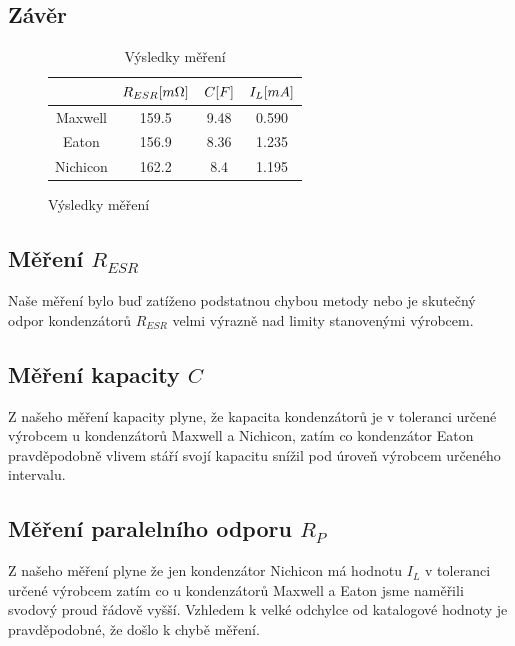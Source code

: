 \documentclass{article}
\begin{document}
\subsection*{Závěr}

\begin{figure}[H]
  \begin{minipage}[t]{\textwidth}
    \begin{table}[H]
      \vspace{-10mm}
      \centering
      \begin{tabular}{|c|c|c|c|}
        \hline
                    & \(R_{ESR}\-[m\Omega]\) & \(C\-[F]\) & \(I_L \-[mA]\) \\ \hline
          Maxwell   & 159.5                  & 9.48       & 0.590          \\ \hline
          Eaton     & 156.9                  & 8.36       & 1.235          \\ \hline
          Nichicon  & 162.2                  & 8.4        & 1.195          \\ \hline
      \end{tabular}
      \caption{\label{Vysledky} Výsledky měření}
    \end{table}
    \vspace{-10mm}
  \end{minipage}
\end{figure}

\subsection*{Měření \(R_{ESR}\)}
Naše měření bylo buď zatíženo podstatnou chybou metody nebo je skutečný odpor kondenzátorů \(R_{ESR}\) velmi výrazně nad limity stanovenými výrobcem. 
\subsection*{Měření kapacity \(C\)}
Z našeho měření kapacity plyne, že kapacita kondenzátorů je v toleranci určené výrobcem u kondenzátorů Maxwell a Nichicon, zatím co kondenzátor Eaton pravděpodobně vlivem stáří svojí kapacitu snížil pod úroveň výrobcem určeného intervalu.
\subsection*{Měření paralelního odporu \(R_P\)}
Z našeho měření plyne že jen kondenzátor Nichicon má hodnotu \(I_L\) v toleranci určené výrobcem zatím co u kondenzátorů Maxwell a Eaton jsme naměřili svodový proud řádově vyšší.
Vzhledem k velké odchylce od katalogové hodnoty je pravděpodobné, že došlo k chybě měření.
\end{document}
